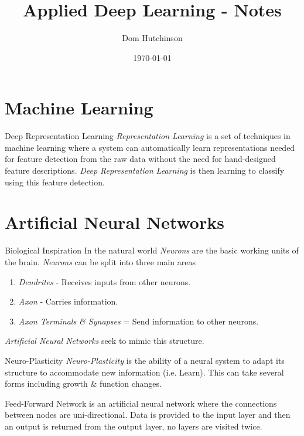 \documentclass[11pt,a4paper]{article}
\begin{document}
\title{Applied Deep Learning - Notes}
\author{Dom Hutchinson}
\date{\today}
\maketitle

\tableofcontents\newpage

\section{Machine Learning}

\begin{definition}{Deep Representation Learning}
  \textit{Representation Learning} is a set of techniques in machine learning where a system can automatically learn representations needed for feature detection from the raw data without the need for hand-designed feature descriptions. \textit{Deep Representation Learning} is then learning to classify using this feature detection.
\end{definition}

\section{Artificial Neural Networks}

\begin{remark}{Biological Inspiration}
  In the natural world \textit{Neurons} are the basic working units of the brain. \textit{Neurons} can be split into three main areas
  \begin{enumerate}
    \item \textit{Dendrites} - Receives inputs from other neurons.
    \item \textit{Axon} - Carries information.
    \item \textit{Axon Terminals \& Synapses} = Send information to other neurons.
  \end{enumerate}
  \textit{Artificial Neural Networks} seek to mimic this structure.
\end{remark}

\begin{definition}{Neuro-Plasticity}
  \textit{Neuro-Plasticity} is the ability of a neural system to adapt its structure to accommodate new information (i.e. Learn). This can take several forms including growth \& function changes.
\end{definition}

\begin{definition}{Feed-Forward Network} is an artificial neural network where the connections between nodes are uni-directional. Data is provided to the input layer and then an output is returned from the output layer, no layers are visited twice.
\end{definition}
\end{document}
